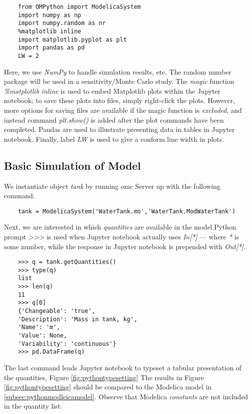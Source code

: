 \begin{lstlisting}
	from OMPython import ModelicaSystem
	import numpy as np
	import numpy.random as nr
	%matplotlib inline
	import matplotlib.pyplot as plt
	import pandas as pd
	LW = 2
\end{lstlisting}

Here, we use \textit{NumPy} to handle simulation results, etc. The random number package will be used in
a sensitivity/Monte Carlo study. The \textit{magic} function \textit{\%matplotlib inline} is used to embed Matplotlib
plots within the Jupyter notebook; to save these plots into files, simply right-click the plots. However, more options
for saving files are available if the magic function is \textit{excluded}, and instead command \textit{plt.show()} is added
after the plot commands have been completed. Pandas are used to illustrate presenting data in tables in Jupyter
notebook. Finally, label \textit{LW} is used to give a conform line width in plots.

\subsection{Basic Simulation of Model}
\label{subsec:pythonsimulatemodel}

We instantiate object \textit{tank} by running \acrshort{omc} Server up with the following command:

\begin{lstlisting}
	tank = ModelicaSystem('WaterTank.mo','WaterTank.ModWaterTank')
\end{lstlisting}

Next, we are interested in which \textit{quantities} are available in the model.Python prompt \textit{>>>} is used when Jupyter
notebook actually uses \textit{In[*]} — where \textit{*} is some number, while the response in Jupyter notebook is prepended
with \textit{Out[*]}.

\begin{lstlisting}
	>>> q = tank.getQuantities()
	>>> type(q)
	list
	>>> len(q)
	11
	>>> q[0]
	{'Changeable': 'true', 
	'Description': 'Mass in tank, kg',
	'Name': 'm',
	'Value': None,
	'Variability': 'continuous'}
	>>> pd.DataFrame(q)
\end{lstlisting}

The last command leads Jupyter notebook to typeset a tabular presentation of the quantities, Figure \ref{fig:pythontypesetting}  The results
in Figure \ref{fig:pythontypesetting} should be compared to the Modelica model in \ref{subsec:pythonmodleicamodel}. Observe that Modelica \textit{constants} are not included in the quantity list.

